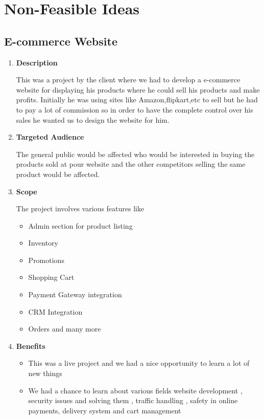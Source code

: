 \documentclass[fleqn,10pt]{../SelfArx} %
\begin{document}

\section{Non-Feasible Ideas}
\subsection{E-commerce Website}
\vspace{0.5cm}
\begin{enumerate}
\item \textbf{Description}

This was a project by the client where we had to develop a e-commerce website for displaying his products where he could sell his products and make profits. Initially he was using sites like Amazon,flipkart,etc to sell but he had to pay a lot of commission so in order to have the complete control over his sales he wanted us to design the website for him.

\item \textbf{Targeted Audience}

The general public would be affected who would be interested in buying the products sold at pour website and the other competitors selling the same product would be affected.

\item \textbf{Scope}

The project involves various features like
\begin{itemize}
    \item Admin section for product listing \item Inventory \item Promotions  \item Shopping Cart \item  Payment Gateway integration \item  CRM Integration \item  Orders and many more
\end{itemize}


 \item \textbf{Benefits}
 
\begin{itemize}
    \item This was a live project and we had a nice opportunity to learn a lot of new things
    \item We had a chance to learn about various fields website development , security issues and solving them , traffic handling , safety in online payments, delivery system and cart management
    

\end{itemize}
\end{enumerate}
\end{document}
